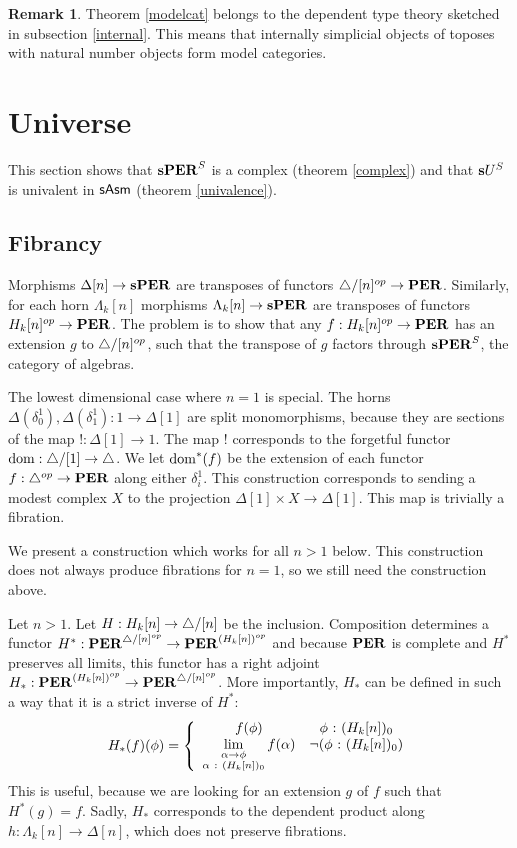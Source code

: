 \documentclass{amsart}
\theoremstyle{plain}
\theoremstyle{definition}
\newtheorem{remark}[theorem]{Remark}
\newcommand\ri{^*}
\begin{document}
\begin{remark} Theorem \ref{modelcat} belongs to the dependent type theory sketched in subsection \ref{internal}. This means that internally simplicial objects of toposes with natural number objects form model categories. \end{remark}

\section{Universe}
This section shows that $\mathbf{s}\mathbf{PER}^S$ is a complex (theorem \ref{complex}) and that $\mathbf{s} U^S$ is univalent in $\mathsf{sAsm}$ (theorem \ref{univalence}).

\subsection{Fibrancy}
Morphisms $\Delta[n] \to \mathbf{s}\mathbf{PER}$ are transposes of functors ${\mathord{\triangle}}/[n]^{op} \to \mathbf{PER}$. Similarly, for each horn $\Lambda_k[n]$ morphisms $\Lambda_k[n] \to \mathbf{s}\mathbf{PER}$ are transposes of functors $H_k[n]^{op} \to \mathbf{PER}$. 
The problem is to show that any $f:H_k[n]^{op} \to \mathbf{PER}$ has an extension $g$ to ${\mathord{\triangle}}/[n]^{op}$, such that the transpose of $g$ factors through $\mathbf{s}\mathbf{PER}^S$, the category of algebras.

The lowest dimensional case where $n=1$ is special. The horns $\Delta(\delta^1_0),\Delta(\delta^1_1):1\to \Delta[1]$ are split monomorphisms, because they are sections of the map $!:\Delta[1]\to 1$. The map $!$ corresponds to the forgetful functor $\mathrm{dom}:{\mathord{\triangle}}/[1]\to{\mathord{\triangle}}$. We let $\mathrm{dom}^*(f)$ be the extension of each functor $f:{\mathord{\triangle}}^{op} \to \mathbf{PER}$ along either $\delta^1_i$. This construction corresponds to sending a modest complex $X$ to the projection $\Delta[1]\times X \to \Delta[1]$. This map is trivially a fibration.

We present a construction which works for all $n>1$ below. This construction does not always produce fibrations for $n=1$, so we still need the construction above.

Let $n>1$. Let $H:H_k[n] \to {\mathord{\triangle}}/[n]$ be the inclusion. Composition determines a functor $H\ri:\pers^{\simcat/[n]\dual} \to \pers^{(H_k[n])\dual}$ and because $\mathbf{PER}$ is complete and $H\ri$ preserves all limits, this functor has a right adjoint $H_*:\mathbf{PER}^{(H_k[n])^{op}}\to\mathbf{PER}^{{\mathord{\triangle}}/[n]^{op}}$. More importantly, $H_*$ can be defined in such a way that it is a strict inverse of $H\ri$:
\[ H_*(f)(\phi) = \left\{\begin{array}{cc} 
f(\phi) & \phi\mathord{\ :\ } (H_k[n])_0\\
\lim\limits_{\substack{\alpha\to \phi\\\alpha\mathord{\ :\ } (H_k[n])_0}} f(\alpha) & \neg(\phi\mathord{\ :\ } (H_k[n])_0)
\end{array}\right.\]
This is useful, because we are looking for an extension $g$ of $f$ such that $H\ri(g) = f$. Sadly, $H_*$ corresponds to the dependent product along $h:\Lambda_k[n] \to \Delta[n]$, which does not preserve fibrations.
\end{document}
